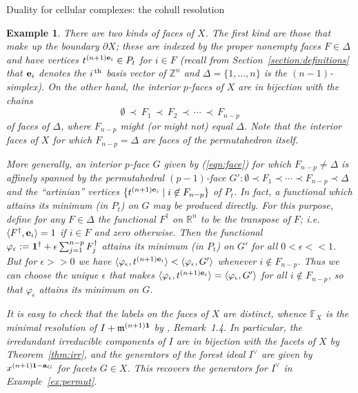 \documentclass[12pt,leqno]{article}
\newtheorem{example}[thm]{Example}
\def\<{{\langle}}
\def\>{{\rangle}}
\def\aa{{{\rm \bf a}}}
\def\ee{{{\rm \bf e}}}
\def\mm{{\mathfrak m}}
\def\FF{{\mathbb F}}
\def\RR{{\mathbb R}}
\def\ZZ{{\mathbb Z}}
\begin{document}
\begin{section}{Duality for cellular complexes: the cohull resolution}
\begin{example}
There are two kinds of faces of $X$.  The first kind are those that make
up the boundary $\partial X$; these are indexed by the proper nonempty
faces $F \in \Delta$ and have vertices $t^{(n+1) \ee_i} \in P_t$ for $i
\in F$ (recall from Section~\ref{section:definitions} that $\ee_i$
denotes the $i^{\,\rm th}$ basis vector of $\ZZ^n$ and $\Delta =
\{1,\ldots,n\}$ is the $(n\!-\!1)$-simplex).  On the other hand, the
interior \hbox{$p$-faces} of $X$ are in bijection with the chains
\begin{equation} \label{eqn:face}
  \emptyset \,\prec\, F_1 \,\prec\, F_2 \,\prec\, \cdots \,\prec\,
  F_{n-p}
\end{equation}
of faces of $\Delta$, where $F_{n-p}$ might (or might not) equal
$\Delta$.  Note that the interior faces of $X$ for which $F_{n-p} =
\Delta$ are faces of the permutahedron itself.

More generally, an interior \hbox{$p$-face} $G$ given by (\ref{eqn:face})
for which $F_{n-p} \neq \Delta$ is affinely spanned by the permutahedral
\hbox{$(p\!-\!1)$-face} $G': \emptyset \prec F_1 \prec \cdots \prec
F_{n-p} \prec \Delta$ and the ``artinian'' vertices $\{t^{(n+1)\ee_i}
\mid i \not\in F_{n-p}\}$ of $P_t$.  In fact, a functional which attains
its minimum (in $P_t$) on $G$ may be produced directly.  For this
purpose, define for any $F \in \Delta$ the functional $F^\dagger$ on
$\RR^n$ to be the transpose of $F$; i.e.\ $\<F^\dagger,\ee_i\> = 1$ if $i
\in F$ and zero otherwise.  Then the functional $\varphi_\epsilon := {\bf
1}^\dagger + \epsilon \sum_{j=1}^{n-p} F_j^\dagger$ attains its minimum
(in $P_t$) on $G'$ for all $0 < \epsilon <\!\!< 1$.  But for $\epsilon
>\!\!> 0$ we have $\<\varphi_\epsilon, t^{(n+1)\ee_i}\> <
\<\varphi_\epsilon, G'\>$ whenever $i \not\in F_{n-p}$.  Thus we can
choose the unique $\epsilon$ that makes $\<\varphi_\epsilon,
t^{(n+1)\ee_i}\> = \<\varphi_\epsilon, G'\>$ for all $i \not\in F_{n-p}$,
so that $\varphi_\epsilon$ attains its minimum on $G$.

It is easy to check that the labels on the faces of $X$ are distinct,
whence $\FF_X$ is the minimal resolution of $I + \mm^{(n+1){\bf 1}}$ by
\cite{BS}, Remark~1.4.  In particular, the irredundant irreducible
components of $I$ are in bijection with the facets of $X$ by
Theorem~\ref{thm:irr}, and the generators of the forest ideal $I^\vee$
are given by $x^{(n+1) {\bf 1} - \aa_G}$ for facets $G \in X$.  This
recovers the generators for $I^\vee$ in Example~\ref{ex:permut}.


\end{example}
\end{section}
\end{document}
